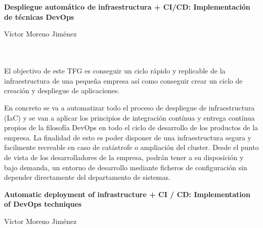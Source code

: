 \chapter*{}





\cleardoublepage
\thispagestyle{empty}

\begin{center}
{\large\bfseries  Despliegue automático de infraestructura + CI/CD: Implementación de técnicas DevOps}\\
\end{center}
\begin{center}
Víctor Moreno Jiménez\\
\end{center}

\\

\vspace{0.7cm}
\\

El objectivo de este TFG es conseguir un ciclo rápido y replicable de la infraestructura de una pequeña empresa así como conseguir crear un ciclo de creación y despliegue de aplicaciones. 

\bigskip 
En concreto se va a automatizar todo el proceso de despliegue de infraestructura (IaC) y se van a aplicar los principios de integración contínua y entrega contínua propios de la filosofía DevOps en todo el ciclo de desarrollo de los productos de la empresa. La finalidad de esto es poder disponer de una infraestructura segura y facilmente recreable en caso de catástrofe o ampliación del cluster. Desde el punto de vista de los desarrolladores de la empresa, podrán tener a su disposición y bajo demanda, un entorno de desarrollo mediante ficheros de configuración sin depender directamente del departamento de sistemas. \bigskip

\cleardoublepage


\thispagestyle{empty}


\begin{center}
{\large\bfseries Automatic deployment of infrastructure + CI / CD: Implementation of DevOps techniques}\\
\end{center}
\begin{center}
Víctor Moreno Jiménez\\
\end{center}

